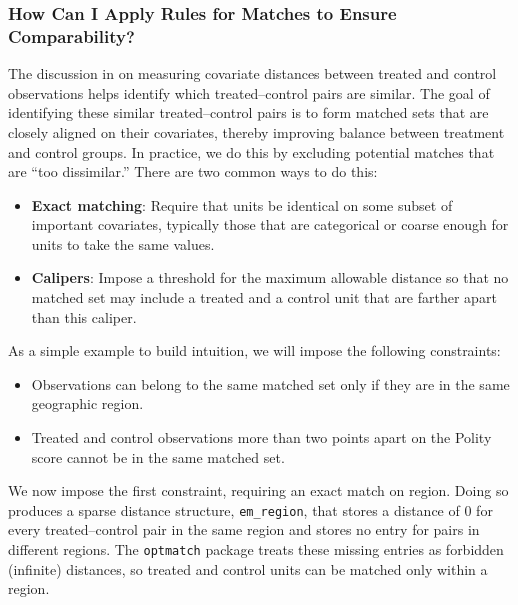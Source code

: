 \documentclass[
  12pt,
  leqno]{article}
\providecommand{\tightlist}{%
  \setlength{\itemsep}{0pt}\setlength{\parskip}{0pt}}
\def\tightlist{}
\begin{document}
\subsubsection{How Can I Apply Rules for Matches to Ensure
Comparability?}\label{how-can-i-apply-rules-for-matches-to-ensure-comparability}

The discussion in
 on measuring
covariate distances between treated and control observations helps
identify which treated--control pairs are similar. The goal of
identifying these similar treated--control pairs is to form matched sets
that are closely aligned on their covariates, thereby improving balance
between treatment and control groups. In practice, we do this by
excluding potential matches that are ``too dissimilar.'' There are two
common ways to do this:

\begin{itemize}
\tightlist
\item
  \textbf{Exact matching}: Require that units be identical on some
  subset of important covariates, typically those that are categorical
  or coarse enough for units to take the same values.
\item
  \textbf{Calipers}: Impose a threshold for the maximum allowable
  distance so that no matched set may include a treated and a control
  unit that are farther apart than this caliper.
\end{itemize}

As a simple example to build intuition, we will impose the following
constraints:

\begin{itemize}
\tightlist
\item
  Observations can belong to the same matched set only if they are in
  the same geographic region.
\item
  Treated and control observations more than two points apart on the
  Polity score cannot be in the same matched set.
\end{itemize}

We now impose the first constraint, requiring an exact match on region.
Doing so produces a sparse distance structure, \texttt{em\_region}, that
stores a distance of \(0\) for every treated--control pair in the same
region and stores no entry for pairs in different regions. The
\texttt{optmatch} package treats these missing entries as forbidden
(infinite) distances, so treated and control units can be matched only
within a region.
\end{document}
